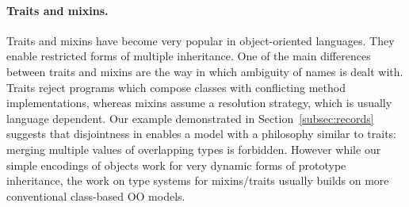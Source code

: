 
%
%
%
%
%
%

\paragraph{Traits and mixins.}
Traits \cite{ducasse2006traits,fisher04atyped,odersky2005scalable} and mixins 
\cite{bracha1990mixin,ancona96algebraic,flatt1998classes,findler1998modular,ancona2003jam,bettini2004corecalculus} 
have become very popular in object-oriented languages. 
They enable restricted forms of multiple inheritance.
One of the main differences between traits and mixins are the way in
which ambiguity of names is dealt with.
Traits reject programs which compose classes with 
conflicting method implementations, whereas mixins assume a resolution strategy,
which is usually language dependent. 
Our example demonstrated in Section~\ref{subsec:records} suggests that
disjointness in \name enables a model with a philosophy similar to
traits: merging multiple values of overlapping types is forbidden. However while our 
simple encodings of objects work for very dynamic forms of prototype
inheritance, the work on type systems for mixins/traits usually builds
on more conventional class-based OO models.




